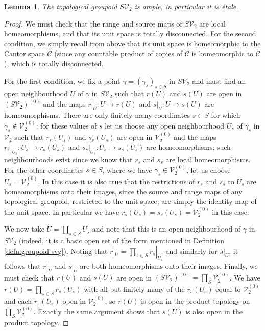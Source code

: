 \documentclass[10pt,a4paper]{amsart}
\numberwithin{equation}{section}
\numberwithin{figure}{section}
\newtheorem{lem}[thm]{Lemma}
\theoremstyle{definition}
\newcommand{\cC}{\mathcal{C}}
\newcommand{\cV}{\mathcal{V}}
\begin{document}
\begin{lem}
\label{lem:SV2-etale}
The topological groupoid $S\cV_2$ is ample, in particular it is étale.
\end{lem}
\begin{proof}
We must check that the range and source maps of $S\cV_2$ are local homeomorphisms, and that its unit space is totally disconnected. For the second condition, we simply recall from above that its unit space is homeomorphic to the Cantor space $\cC$ (since any countable product of copies of $\cC$ is homeomorphic to $\cC$), which is totally disconnected.

For the first condition, we fix a point $\gamma = (\gamma_s)_{s\in S}$ in $S\cV_2$ and must find an open neighbourhood $U$ of $\gamma$ in $S\cV_2$ such that $r(U)$ and $s(U)$ are open in $(S\cV_2)^{(0)}$ and the maps $r|_U \colon U \to r(U)$ and $s|_U \colon U \to s(U)$ are homeomorphisms. There are only finitely many coordinates $s \in S$ for which $\gamma_s \notin \cV_2^{(0)}$; for these values of $s$ let us choose any open neighbourhood $U_s$ of $\gamma_s$ in $\cV_2$ such that $r_s(U_s)$ and $s_s(U_s)$ are open in $\cV_2^{(0)}$ and the maps $r_s|_{U_s} \colon U_s \to r_s(U_s)$ and $s_s|_{U_s} \colon U_s \to s_s(U_s)$ are homeomorphisms; such neighbourhoods exist since we know that $r_s$ and $s_s$ are local homeomorphisms. For the other coordinates $s \in S$, where we have $\gamma_s \in \cV_2^{(0)}$, let us choose $U_s = \cV_2^{(0)}$. In this case it is also true that the restrictions of $r_s$ and $s_s$ to $U_s$ are homeomorphisms onto their images, since the source and range maps of any topological groupoid, restricted to the unit space, are simply the identity map of the unit space. In particular we have $r_s(U_s) = s_s(U_s) = \cV_2^{(0)}$ in this case.

We now take $U = \prod_{s\in S} U_s$ and note that this is an open neighbourhood of $\gamma$ in $S\cV_2$ (indeed, it is a basic open set of the form mentioned in Definition \ref{defn:groupoid-svg}). Noting that $r|_U = \prod_{s\in S} r_s|_{U_s}$ and similarly for $s|_U$, it follows that $r|_U$ and $s|_U$ are both homeomorphisms onto their images. Finally, we must check that $r(U)$ and $s(U)$ are open in $(S\cV_2)^{(0)} = \prod_S \cV_2^{(0)}$. We have $r(U) = \prod_{s\in S} r_s(U_s)$ with all but finitely many of the $r_s(U_s)$ equal to $\cV_2^{(0)}$ and each $r_s(U_s)$ open in $\cV_2^{(0)}$, so $r(U)$ is open in the product topology on $\prod_S \cV_2^{(0)}$. Exactly the same argument shows that $s(U)$ is also open in the product topology.
\end{proof}
\end{document}
